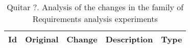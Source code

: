 
\begin{table}
\caption{\textcolor[rgb]{1,0,0}{Quitar ?.} Analysis of the changes in the family of Requirements analysis experiments}
\label{tab:changesALE}
\begin{minipage}{6cm}

\begin{tabular}{| l | l | l |p{6cm} | p{1cm}|}
\hline
\textbf{Id} & \textbf{Original} & \textbf{Change}  & \textbf{Description}& \textbf{Type}\\
\hline


\end{tabular}
\end{minipage}
\end{table}
